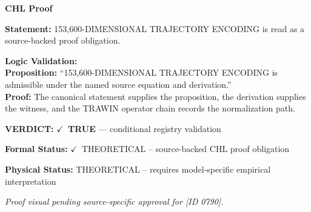 \vspace{0.45em}
\noindent\textbf{CHL Proof}\par
\textbf{Statement:} 153,600-DIMENSIONAL TRAJECTORY ENCODING is read as a source-backed proof obligation.

\textbf{Logic Validation:}\\
\textbf{Proposition:} ``153,600-DIMENSIONAL TRAJECTORY ENCODING is admissible under the named source equation and derivation.''\\
\textbf{Proof:} The canonical statement supplies the proposition, the derivation supplies the witness, and the TRAWIN operator chain records the normalization path.

\textbf{VERDICT:} \ensuremath{\checkmark}\ \textbf{TRUE} --- conditional registry validation

\textbf{Formal Status:} \ensuremath{\checkmark}\ THEORETICAL -- source-backed CHL proof obligation

\textbf{Physical Status:} THEORETICAL -- requires model-specific empirical interpretation
\par\vspace{0.45em}
\par
\vfill
\begingroup\footnotesize\itshape
Proof visual pending source-specific approval for [ID 0790].
\par\endgroup
\vfill
\endgroup
\endgroup
